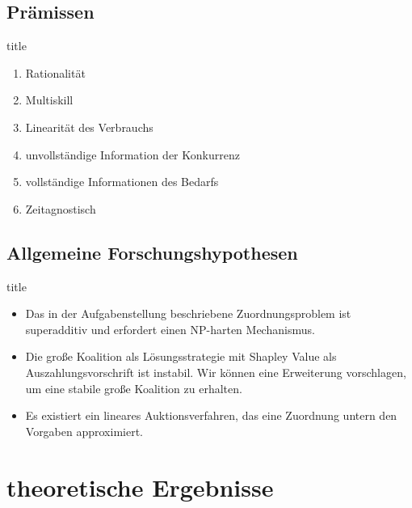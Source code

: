\documentclass[c]{beamer}
\theoremstyle{break}
\begin{document}
  \subsection*{Prämissen}
  \begin{frame}{title} %
    \begin{enumerate}
      \item Rationalität
      \item Multiskill
      \item Linearität des Verbrauchs
      \item unvollständige Information der Konkurrenz
      \item vollständige Informationen des Bedarfs
      \item Zeitagnostisch
    \end{enumerate}
  \end{frame}


  \subsection*{Allgemeine Forschungshypothesen}
  \begin{frame}{title} %
    \begin{itemize}
      \item Das in der Aufgabenstellung beschriebene Zuordnungsproblem ist superadditiv  und erfordert einen NP-harten Mechanismus.
      \item Die große Koalition als Lösungsstrategie mit Shapley Value als  Auszahlungsvorschrift ist instabil. Wir können eine Erweiterung vorschlagen, um eine stabile große Koalition zu erhalten.
      \item Es existiert ein lineares Auktionsverfahren, das eine Zuordnung untern den Vorgaben approximiert.
    \end{itemize}
  \end{frame}


  \section*{theoretische Ergebnisse}
\end{document}
